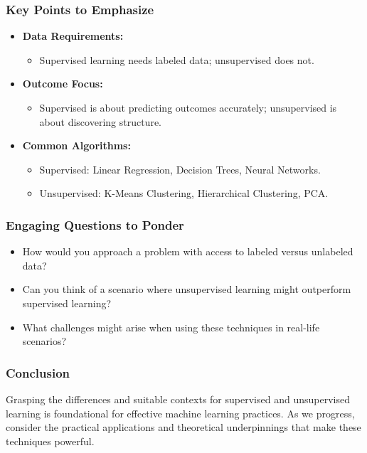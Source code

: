 \documentclass[aspectratio=169]{beamer}
\begin{document}
\begin{frame}[fragile]
    \frametitle{Key Points to Emphasize}
    \begin{itemize}
        \item \textbf{Data Requirements:} 
            \begin{itemize}
                \item Supervised learning needs labeled data; unsupervised does not.
            \end{itemize}
        \item \textbf{Outcome Focus:} 
            \begin{itemize}
                \item Supervised is about predicting outcomes accurately; unsupervised is about discovering structure.
            \end{itemize}
        \item \textbf{Common Algorithms:} 
            \begin{itemize}
                \item Supervised: Linear Regression, Decision Trees, Neural Networks.
                \item Unsupervised: K-Means Clustering, Hierarchical Clustering, PCA.
            \end{itemize}
    \end{itemize}
\end{frame}

\begin{frame}[fragile]
    \frametitle{Engaging Questions to Ponder}
    \begin{itemize}
        \item How would you approach a problem with access to labeled versus unlabeled data?
        \item Can you think of a scenario where unsupervised learning might outperform supervised learning?
        \item What challenges might arise when using these techniques in real-life scenarios?
    \end{itemize}
\end{frame}

\begin{frame}[fragile]
    \frametitle{Conclusion}
    Grasping the differences and suitable contexts for supervised and unsupervised learning is foundational for effective machine learning practices. As we progress, consider the practical applications and theoretical underpinnings that make these techniques powerful.
\end{frame}
\end{document}
